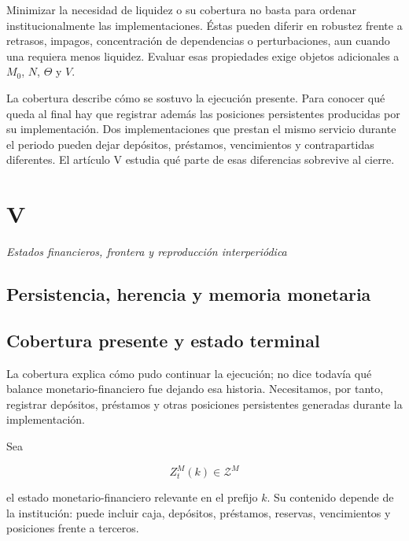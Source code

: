 \documentclass[10pt,a5paper,twoside]{article}
\begin{document}
Minimizar la necesidad de liquidez o su cobertura no basta para ordenar
institucionalmente las implementaciones. Éstas pueden diferir en robustez
frente a retrasos, impagos, concentración de dependencias o perturbaciones,
aun cuando una requiera menos liquidez.
Evaluar esas propiedades exige objetos adicionales a \(M_0\), \(N\),
\(\Theta\) y \(V\).

La cobertura describe cómo se sostuvo la ejecución presente. Para conocer
qué queda al final hay que registrar además las posiciones persistentes
producidas por su implementación. Dos implementaciones que prestan el mismo
servicio durante el periodo pueden dejar depósitos, préstamos, vencimientos
y contrapartidas diferentes. El artículo V estudia qué parte de esas
diferencias sobrevive al cierre.


\cleardoublepage
\setcounter{subsection}{0}
\vspace*{6mm}\section*{V}\label{v.-estados-financieros-frontera-y-reproducciuxf3n-interperiuxf3dica}
\thispagestyle{plain}
{\large\itshape Estados financieros, frontera y reproducción interperiódica\par}\vspace{1.2ex}

\subsection*{Persistencia, herencia y memoria monetaria}\label{persistencia-herencia-y-memoria-monetaria}

\subsection{Cobertura presente y estado terminal}\label{cobertura-presente-y-estado-terminal}

La cobertura explica cómo pudo continuar la ejecución; no dice todavía qué balance
monetario-financiero fue dejando esa historia. Necesitamos, por tanto, registrar depósitos,
préstamos y otras posiciones persistentes generadas durante la implementación.

Sea

\[
Z_t^M(k)\in\mathcal Z^M
\]

el estado monetario-financiero relevante en el prefijo \(k\). Su contenido depende de la institución: puede incluir caja, depósitos,
préstamos, reservas, vencimientos y posiciones frente a terceros.
\end{document}
